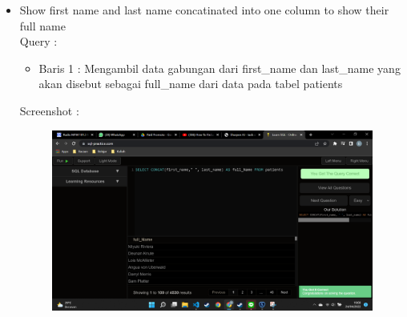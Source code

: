 \documentclass[]{article}
\begin{document}
\begin{itemize}
        \item Show first name and last name concatinated into one column to show their full name
        \\Query :
        
        \begin{itemize}
            \item Baris 1 : Mengambil data gabungan dari first\_name dan last\_name yang akan disebut sebagai full\_name dari data pada tabel patients
        \end{itemize}
        \pagebreak
        Screenshot :
        \begin{figure}[h]
            \includegraphics[scale=0.3]{./Screenshot/Easy-6.png}
            \centering
        \end{figure}


\end{itemize}
\end{document}
